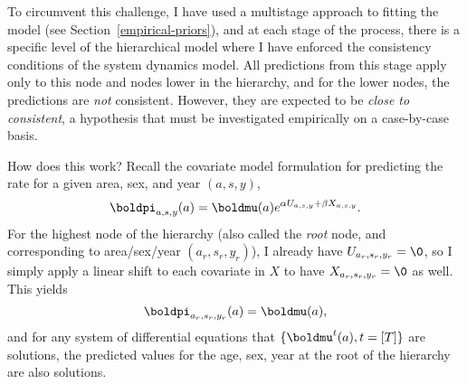 To circumvent this challenge, I have used a multistage approach to
fitting the model (see Section~\ref{empirical-priors}), and at each
stage of the process, there is a specific level of the hierarchical
model where I have enforced the consistency conditions of the system
dynamics model.  All predictions from this stage apply only to this
node and nodes lower in the hierarchy, and for the lower nodes, the
predictions are \emph{not} consistent.  However, they are expected to
be \emph{close to consistent}, a hypothesis that must be investigated
empirically on a case-by-case basis.

How does this work?  Recall the covariate model formulation for
predicting the rate for a given area, sex, and year $(a,s,y)$,
\[
\boldpi_{a,s,y}(a) = \boldmu(a)e^{\alpha U_{a,s,y} + \beta X_{a,s,y}}.
\]
For the highest node of the hierarchy (also called the \emph{root}
node, and corresponding to area/sex/year $(a_r, s_r, y_r)$), I already
have $U_{a_r,s_r,y_r} = \0$, so I simply apply a linear shift to each
covariate in $X$ to have $X_{{a_r},{s_r},{y_r}} = \0$ as well.  This
yields
\[
\boldpi_{a_r,s_r,y_r}(a) = \boldmu(a),
\]
and for any system of differential equations that $\{\boldmu^t(a),
t=[T]\}$ are solutions, the predicted values for the age, sex, year at
the root of the hierarchy are also solutions.
